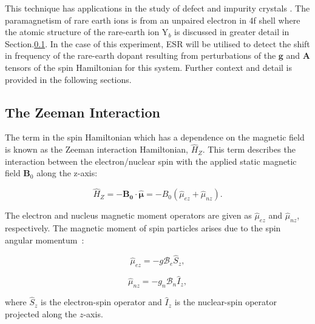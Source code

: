 This technique has applications in the study of defect and impurity crystals \citep{Stoneham}. The paramagnetism of rare earth ions is from an unpaired electron in 4f shell where the atomic structure of the rare-earth ion Y$_{b}$ is discussed in greater detail in Section.\ref{}. In the case of this experiment, ESR will be utilised to detect the shift in frequency of the rare-earth dopant resulting from perturbations of the $\bm{g}$ and $\bm{A}$ tensors of the spin Hamiltonian for this system. Further context and detail is provided in the following sections. 

\subsection{\label{sec:zeeman}The Zeeman Interaction}
The term in the spin Hamiltonian which has a dependence on the magnetic field is known as the Zeeman interaction Hamiltonian, $\hat{H}_{Z}$. This term describes the interaction between the electron/nuclear spin with the applied static magnetic field $\bm{B}_{0}$ along the z-axis:

\begin{equation}
\label{eq:zeemanhamiltonian}
\hat{H}_{Z}=-\bm{B_{0}}\cdot \bm{\hat{\mu}}=-B_{0} (\hat{\mu}_{ez}+\hat{\mu}_{nz}).
\end{equation} 

\noindent The electron and nucleus magnetic moment operators are given as $\hat{\mu}_{ez}$ and $\hat{\mu}_{nz}$, respectively. The magnetic moment of spin particles arises due to the spin angular momentum~\citep{atherton1973electron}: 

\begin{minipage}{0.4\linewidth}  
\begin{equation}
\label{eq:electronspinoperator}
\hat{\mu}_{ez}= -g \mathcal{B}_{e} \hat{S}_{z},
\end{equation}  
\end{minipage}  
\hspace{0.5cm}  
\begin{minipage}{0.4\linewidth}  
\begin{equation}
\label{eq:nuclearspinoperator}
\hat{\mu}_{nz}= -g_{n} \mathcal{B}_{n} \hat{I}_{z},
\end{equation}  
\end{minipage}

\noindent where $\hat{S}_{z}$ is the electron-spin operator and $\hat{I}_{z}$ is the nuclear-spin operator projected along the $z$-axis. 

